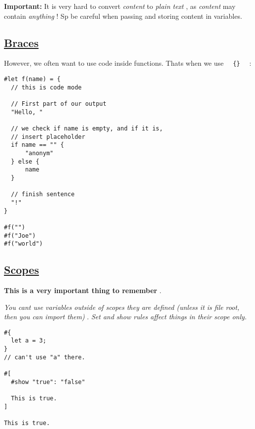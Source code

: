 \pandocbounded{}

\textbf{Important:} It is very hard to convert \emph{content} to
\emph{plain text} , as \emph{content} may contain \emph{anything} ! Sp
be careful when passing and storing content in variables.

\subsection{\texorpdfstring{\hyperref[braces]{Braces}}{Braces}}\label{braces}

However, we often want to use code inside functions.
That\textquotesingle s when we use
\texttt{\ }{\texttt{\ \{\}\ }}\texttt{\ } :

\begin{verbatim}
#let f(name) = {
  // this is code mode

  // First part of our output
  "Hello, "

  // we check if name is empty, and if it is,
  // insert placeholder
  if name == "" {
      "anonym"
  } else {
      name
  }

  // finish sentence
  "!"
}

#f("")
#f("Joe")
#f("world")
\end{verbatim}

\pandocbounded{}

\subsection{\texorpdfstring{\hyperref[scopes]{Scopes}}{Scopes}}\label{scopes}

\textbf{This is a very important thing to remember} .

\emph{You can\textquotesingle t use variables outside of scopes they are
defined (unless it is file root, then you can import them)} . \emph{Set
and show rules affect things in their scope only.}

\begin{verbatim}
#{
  let a = 3;
}
// can't use "a" there.

#[
  #show "true": "false"

  This is true.
]

This is true.
\end{verbatim}

